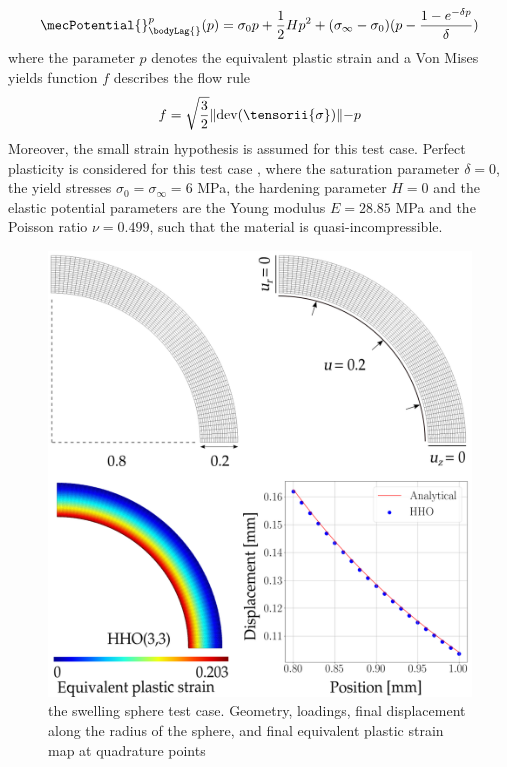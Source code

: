 \begin{equation}
    \mecPotential{}_{\bodyLag{}}^p(p)
    =
    \sigma_0 p + \frac{1}{2} H p^2 + (\sigma_{\infty} - \sigma_0)(p - \frac{1 - e^{-\delta p}}{\delta})
\end{equation}
%
%
%
where the parameter $p$ denotes the equivalent plastic strain and a Von Mises yields function $f$ describes the flow rule
%
%
%
\begin{equation}
    f = \sqrt{\frac{3}{2}} \rVert \text{dev} (\tensorii{\sigma}) \lVert - p
\end{equation}
%
%
%
Moreover, the small strain hypothesis is assumed for this test case.
Perfect plasticity is considered for this test case , where the saturation parameter $\delta = 0$, the yield stresses $\sigma_0 = \sigma_{\infty} = 6$ MPa, the hardening parameter $H = 0$ and the elastic potential parameters are the Young modulus $E = 28.85$ MPa and the Poisson ratio $\nu = 0.499$, such that the material is quasi-incompressible.

\begin{figure}[H]
    \centering
    \includegraphics[width=12.cm]{img_calcs/sphere_mesh.png}
    \caption{the swelling sphere test case. Geometry, loadings, final displacement along the radius of the sphere, and final equivalent plastic strain map at quadrature points}
    \label{fig_sphereall}
\end{figure}

